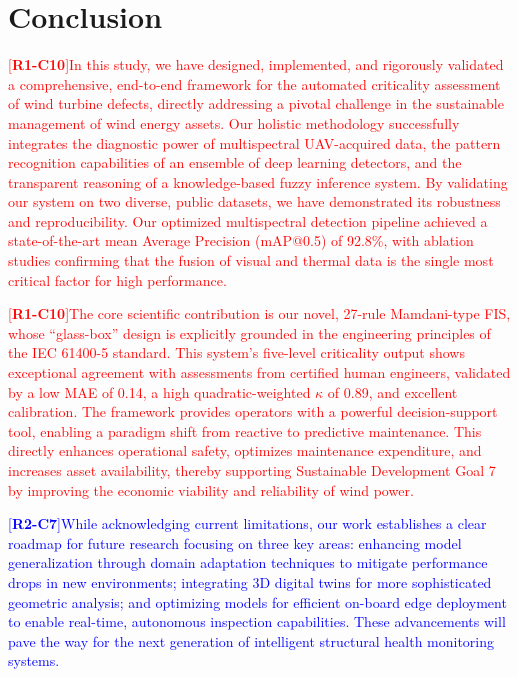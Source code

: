 \documentclass[energies,article,submit,pdftex,moreauthors]{Definitions/mdpi}
\newcommand{\revtag}[2]{[\textbf{R#1-C#2}]}
\newcommand{\Rone}[1]{\textcolor{red}{#1}}
\newcommand{\Rtwo}[1]{\textcolor{blue}{#1}}
\begin{document}
\section{Conclusion}\label{sec:conclusions}

\Rone{\revtag{1}{10}In this study, we have designed, implemented, and rigorously validated a comprehensive, end-to-end framework for the automated criticality assessment of wind turbine defects, directly addressing a pivotal challenge in the sustainable management of wind energy assets. Our holistic methodology successfully integrates the diagnostic power of multispectral UAV-acquired data, the pattern recognition capabilities of an ensemble of deep learning detectors, and the transparent reasoning of a knowledge-based fuzzy inference system. By validating our system on two diverse, public datasets, we have demonstrated its robustness and reproducibility. Our optimized multispectral detection pipeline achieved a state-of-the-art mean Average Precision (mAP@0.5) of 92.8\%, with ablation studies confirming that the fusion of visual and thermal data is the single most critical factor for high performance.}

\Rone{\revtag{1}{10}The core scientific contribution is our novel, 27-rule Mamdani-type FIS, whose ``glass-box'' design is explicitly grounded in the engineering principles of the IEC 61400-5 standard. This system's five-level criticality output shows exceptional agreement with assessments from certified human engineers, validated by a low MAE of 0.14, a high quadratic-weighted \(\kappa\) of 0.89, and excellent calibration. The framework provides operators with a powerful decision-support tool, enabling a paradigm shift from reactive to predictive maintenance. This directly enhances operational safety, optimizes maintenance expenditure, and increases asset availability, thereby supporting Sustainable Development Goal 7 by improving the economic viability and reliability of wind power.}

\Rtwo{\revtag{2}{7}While acknowledging current limitations, our work establishes a clear roadmap for future research focusing on three key areas: enhancing model generalization through domain adaptation techniques to mitigate performance drops in new environments; integrating 3D digital twins for more sophisticated geometric analysis; and optimizing models for efficient on-board edge deployment to enable real-time, autonomous inspection capabilities. These advancements will pave the way for the next generation of intelligent structural health monitoring systems.}
\end{document}
